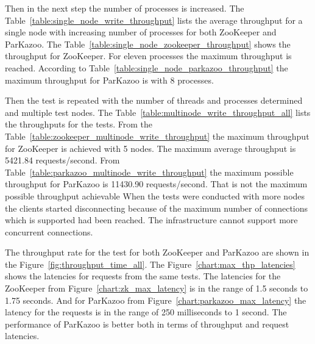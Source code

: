 

Then in the next step the number of processes is increased. The Table~\ref{table:single_node_write_throughput} lists the average throughput for a single node with increasing number of processes for both ZooKeeper and ParKazoo. The Table~\ref{table:single_node_zookeeper_throughput} shows the throughput for ZooKeeper. For eleven processes the maximum throughput is reached. According to Table~\ref{table:single_node_parkazoo_throughput} the maximum throughput for ParKazoo is with 8 processes.

Then the test is repeated with the number of threads and processes determined and multiple test nodes. The Table~\ref{table:multinode_write_throughput_all} lists the throughputs for the tests. From the Table~\ref{table:zookeeper_multinode_write_throughput} the maximum throughput for ZooKeeper is achieved with 5 nodes. The maximum average throughput is 5421.84 requests/second. From Table~\ref{table:parkazoo_multinode_write_throughput} the maximum possible throughput for ParKazoo is 11430.90 requests/second. That is not the maximum possible throughput achievable When the tests were conducted with more nodes the clients started disconnecting because of the maximum number of connections which is supported had been reached. The infrastructure cannot support more concurrent connections.



The throughput rate for the test for both ZooKeeper and ParKazoo are shown in the Figure~\ref{fig:throughput_time_all}. The Figure~\ref{chart:max_thp_latencies} shows the latencies for requests from the same tests. The latencies for the ZooKeeper from Figure~\ref{chart:zk_max_latency} is in the range of 1.5 seconds to 1.75 seconds. And for ParKazoo from Figure~\ref{chart:parkazoo_max_latency} the latency for the requests is in the range of 250 milliseconds to 1 second. The performance of ParKazoo is better both in terms of throughput and request latencies.




